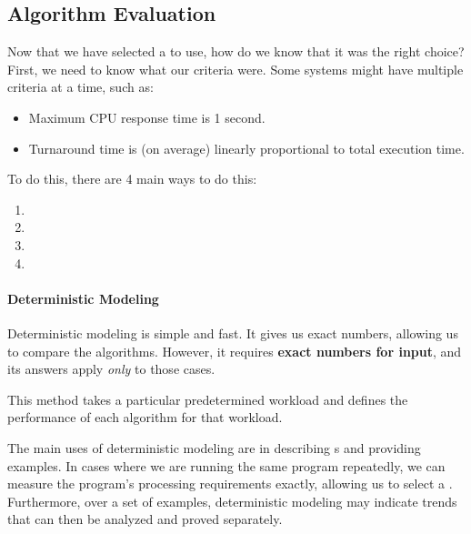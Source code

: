\subsection{Algorithm Evaluation}\label{subsec:Algorithm_Evaluation}
Now that we have selected a  to use, how do we know that it was the right choice?
First, we need to know what our criteria were.
Some systems might have multiple criteria at a time, such as:
\begin{itemize}[noitemsep]
\item Maximum CPU response time is 1 second.
\item Turnaround time is (on average) linearly proportional to total execution time.
\end{itemize}

To do this, there are 4 main ways to do this:
\begin{enumerate}[noitemsep]
\item {}
\item {}
\item {}
\item {}
\end{enumerate}

\paragraph{Deterministic Modeling}\label{par:Deterministic_Modeling}
Deterministic modeling is simple and fast.
It gives us exact numbers, allowing us to compare the algorithms.
However, it requires \textbf{exact numbers for input}, and its answers apply \emph{only} to those cases.

This method takes a particular predetermined workload and defines the performance of each algorithm for that workload.

The main uses of deterministic modeling are in describing s and providing examples.
In cases where we are running the same program repeatedly, we can measure the program’s processing requirements exactly, allowing us to select a .
Furthermore, over a set of examples, deterministic modeling may indicate trends that can then be analyzed and proved separately.


